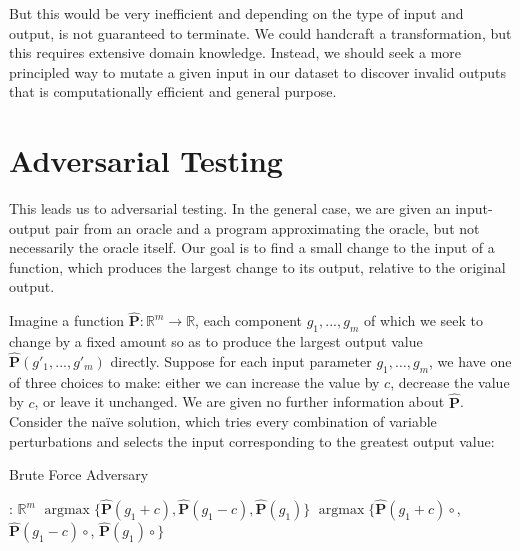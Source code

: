 \documentclass[12pt,initial,twoside,maitrise]{dms}
\numberwithin{equation}{section}
\numberwithin{table}{chapter}
\numberwithin{figure}{chapter}
\begin{document}
But this would be very inefficient and depending on the type of input and output, is not guaranteed to terminate. We could handcraft a transformation, but this requires extensive domain knowledge. Instead, we should seek a more principled way to mutate a given input in our dataset to discover invalid outputs that is computationally efficient and general purpose.

\section{Adversarial Testing}

This leads us to adversarial testing. In the general case, we are given an input-output pair from an oracle and a program approximating the oracle, but not necessarily the oracle itself. Our goal is to find a small change to the input of a function, which produces the largest change to its output, relative to the original output.

Imagine a function $\mathbf{\hat P}: \mathbb R^m \rightarrow \mathbb R$, each component $g_1, ..., g_{m}$ of which we seek to change by a fixed amount so as to produce the largest output value $\mathbf{\hat P}(g'_1, ..., g'_{m})$ directly. Suppose for each input parameter $g_1, \ldots, g_{m}$, we have one of three choices to make: either we can increase the value by $c$, decrease the value by $c$, or leave it unchanged. We are given no further information about $\mathbf{\hat P}$. Consider the na\"ive solution, which tries every combination of variable perturbations and selects the input corresponding to the greatest output value:

\begin{algorithm}[H]
\caption{Brute Force Adversary}
\label{alg:bf_adversary}
\begin{algorithmic}[1]
: $\mathbb{R}^m$
 
\State \Return $\operatorname{argmax}\{\mathbf{\hat P}(g_1 + c), \mathbf{\hat P}(g_1 - c), \mathbf{\hat P}(g_1)\}$
\Else {}
\State \Return $\operatorname{argmax}\{\mathbf{\hat P}(g_1 + c) \circ$,\newline
\hspace*{10em} $\mathbf{\hat P}(g_1 - c)\circ$,\newline
\hspace*{10em} $\mathbf{\hat P}(g_1)\circ$$\}$
\EndIf
\EndProcedure
\end{algorithmic}
\end{algorithm}
\end{document}
